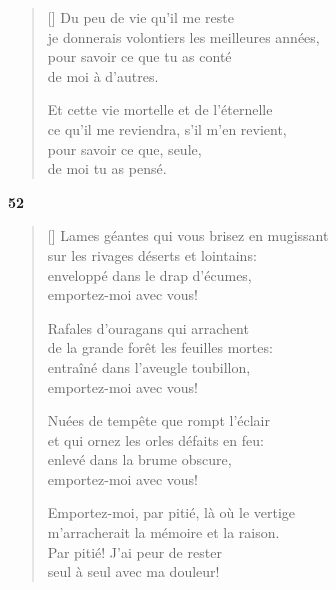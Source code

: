 \documentclass[a4paper,12pt]{book}
\begin{document}
\settowidth{\versewidth}{je donnerais volontiers les meilleures années,}

\begin{verse}[\versewidth]
  Du peu de vie qu'il me reste \\
  je donnerais volontiers les meilleures années, \\
  pour savoir ce que tu as conté \\
  de moi à d'autres.

  Et cette vie mortelle et de l'éternelle \\
  ce qu'il me reviendra, s'il m'en revient, \\
  pour savoir ce que, seule, \\
  de moi tu as pensé.
\end{verse}

\bigskip

\begin{center}
  \textbf{52}
\end{center}

\settowidth{\versewidth}{Lames géantes qui vous brisez en mugissant}

\begin{verse}[\versewidth]
  Lames géantes qui vous brisez en mugissant \\
  sur les rivages déserts et lointains: \\
  enveloppé dans le drap d'écumes, \\
  emportez-moi avec vous!

  Rafales d'ouragans qui arrachent \\
  de la grande forêt les feuilles mortes: \\
  entraîné dans l'aveugle toubillon, \\
  emportez-moi avec vous!

  Nuées de tempête que rompt l'éclair \\
  et qui ornez les orles défaits en feu: \\
  enlevé dans la brume obscure, \\
  emportez-moi avec vous!

  Emportez-moi, par pitié, là où le vertige \\
  m'arracherait la mémoire et la raison. \\
  Par pitié! J'ai peur de rester \\
  seul à seul avec ma douleur!
\end{verse}
\end{document}
